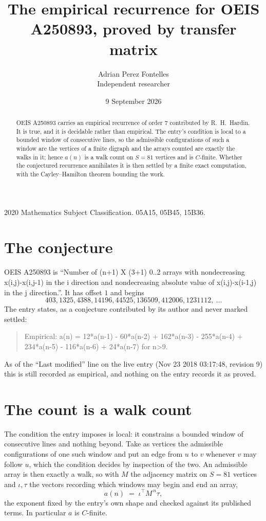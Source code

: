 \documentclass[11pt,a4paper]{article}
\title{The empirical recurrence for OEIS A250893, proved by transfer matrix}
\author{Adrian Perez Fontelles\\ \small Independent researcher}
\date{9 September 2026}
\theoremstyle{plain}
\theoremstyle{definition}
\begin{document}
\maketitle

\begin{abstract}
OEIS A250893 carries an empirical recurrence of order $7$ contributed by R.~H.~Hardin. It is
true, and it is decidable rather than empirical. The entry's condition is local to a bounded window of consecutive lines, so
the admissible configurations of such a window are the vertices of a finite digraph and the
arrays counted are exactly the walks in it; hence $a(n)$ is a walk count on $S=81$ vertices
and is $C$-finite. Whether the conjectured recurrence annihilates it is then settled by a
finite exact computation, with the Cayley--Hamilton theorem bounding the work.
\end{abstract}

\noindent\small 2020 Mathematics Subject Classification. 05A15, 05B45, 15B36.\normalsize

\section{The conjecture}

OEIS A250893 is ``Number of (n+1) X (3+1) 0..2 arrays with nondecreasing x(i,j)-x(i,j-1) in the i direction and nondecreasing absolute value of x(i,j)-x(i-1,j) in the j direction.''. It has offset $1$ and begins
\[
403, 1325, 4388, 14196, 44525, 136509, 412006, 1231112,\ \dots
\]
The entry states, as a conjecture contributed by its author and never marked settled:
\begin{quote}
Empirical: a(n) = 12*a(n-1) - 60*a(n-2) + 162*a(n-3) - 255*a(n-4) + 234*a(n-5)  - 116*a(n-6) + 24*a(n-7) for n>9.
\end{quote}
As of the ``Last modified'' line on the live entry (Nov 23 2018 03:17:48, revision 9) this is still
recorded as empirical, and nothing on the entry records it as proved.

\section{The count is a walk count}

The condition the entry imposes is local: it constrains a bounded window of consecutive lines and nothing beyond. Take as
vertices the admissible configurations of one such window and put an edge from $u$ to $v$
whenever $v$ may follow $u$, which the condition decides by inspection of the two. An
admissible array is then exactly a walk, so with $M$ the adjacency matrix on $S=81$ vertices
and $\iota,\tau$ the vectors recording which windows may begin and end an array,
\[
a(n)\;=\;\iota^{\!\top}M^{\,n}\tau ,
\]
the exponent fixed by the entry's own shape and checked against its published terms. In
particular $a$ is $C$-finite.
\end{document}
